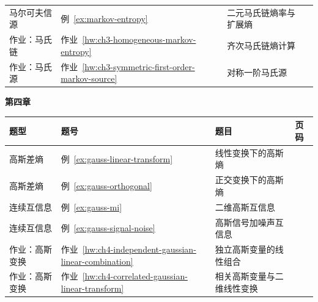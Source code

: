 {\begin{tabularx}{\textwidth}{@{}p{}p{}>{\raggedright\arraybackslash}X>{\raggedleft\arraybackslash}p{}@{}}
马尔可夫信源 & 例~\ref{ex:markov-entropy} & 二元马氏链熵率与扩展熵 & \hyperref[ex:markov-entropy]{\pageref*{ex:markov-entropy}}  \\
作业：马氏链 & 作业~\ref{hw:ch3-homogeneous-markov-entropy} & 齐次马氏链熵计算 & \hyperref[hw:ch3-homogeneous-markov-entropy]{\pageref*{hw:ch3-homogeneous-markov-entropy}}  \\
作业：马氏源 & 作业~\ref{hw:ch3-symmetric-first-order-markov-source} & 对称一阶马氏源 & \hyperref[hw:ch3-symmetric-first-order-markov-source]{\pageref*{hw:ch3-symmetric-first-order-markov-source}}  \\
\bottomrule
\end{tabularx}

\noindent\textbf{第四章}\par
\begin{tabularx}{\textwidth}{@{}p{}p{}>{\raggedright\arraybackslash}X>{\raggedleft\arraybackslash}p{}@{}}
\toprule
\textbf{题型} & \textbf{题号} & \textbf{题目} & \textbf{页码} \\
\midrule
高斯差熵 & 例~\ref{ex:gauss-linear-transform} & 线性变换下的高斯熵 & \hyperref[ex:gauss-linear-transform]{\pageref*{ex:gauss-linear-transform}}  \\
高斯差熵 & 例~\ref{ex:gauss-orthogonal} & 正交变换下的高斯熵 & \hyperref[ex:gauss-orthogonal]{\pageref*{ex:gauss-orthogonal}}  \\
连续互信息 & 例~\ref{ex:gauss-mi} & 二维高斯互信息 & \hyperref[ex:gauss-mi]{\pageref*{ex:gauss-mi}}  \\
连续互信息 & 例~\ref{ex:gauss-signal-noise} & 高斯信号加噪声互信息 & \hyperref[ex:gauss-signal-noise]{\pageref*{ex:gauss-signal-noise}}  \\
作业：高斯变换 & 作业~\ref{hw:ch4-independent-gaussian-linear-combination} & 独立高斯变量的线性组合 & \hyperref[hw:ch4-independent-gaussian-linear-combination]{\pageref*{hw:ch4-independent-gaussian-linear-combination}}  \\
作业：高斯变换 & 作业~\ref{hw:ch4-correlated-gaussian-linear-transform} & 相关高斯变量与二维线性变换 & \hyperref[hw:ch4-correlated-gaussian-linear-transform]{\pageref*{hw:ch4-correlated-gaussian-linear-transform}}  \\
\bottomrule
\end{tabularx}

}
